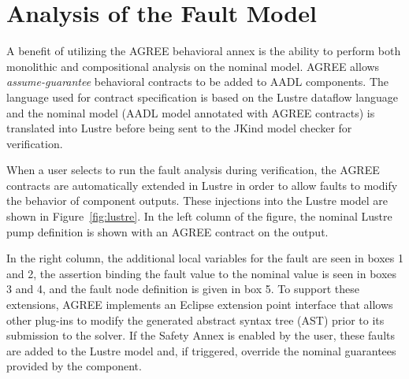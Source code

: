 \section{Analysis of the Fault Model}
\label{sec:fault_analysis}

A  benefit of utilizing the AGREE behavioral annex is the ability to perform both monolithic and compositional analysis on the nominal model. AGREE allows {\em assume-guarantee} behavioral contracts to be added to AADL components.  The language used for contract specification is based on the Lustre dataflow language~\cite{Halbwachs91:IEEE} and the nominal model (AADL model annotated with AGREE contracts) is translated into Lustre before being sent to the JKind model checker for verification\cite{2017arXiv171201222G}. 

When a user selects to run the fault analysis during verification, the AGREE contracts are automatically extended in Lustre in order to allow faults to modify the behavior of component outputs. These injections into the Lustre model are shown in Figure~\ref{fig:lustre}. In the left column of the figure, the nominal Lustre pump definition is shown with an AGREE contract on the output. 

In the right column, the additional local variables for the fault are seen in boxes 1 and 2, the assertion binding the fault value to the nominal value is seen in boxes 3 and 4, and the fault node definition is given in box 5. To support these extensions, AGREE implements an Eclipse extension point interface that allows other plug-ins to modify the generated abstract syntax tree (AST) prior to its submission to the solver.  If the Safety Annex is enabled by the user, these faults are added to the Lustre model and, if triggered, override the nominal guarantees provided by the component.

